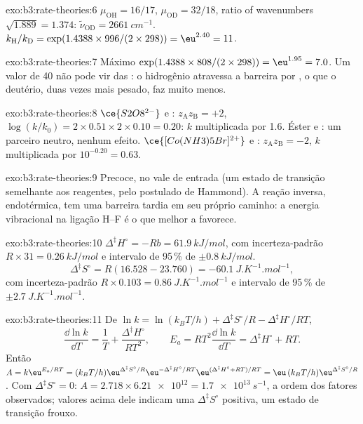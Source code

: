 \begin{solution}{exo:b3:rate-theories:6}
$\mu_{\mathrm{OH}} = 16/17$, $\mu_{\mathrm{OD}} = 32/18$, ratio of wavenumbers $\sqrt{1.889} = 1.374$:
$\tilde\nu_{\mathrm{OD}} = \qty{2661}{cm^{-1}}$. $k_{\mathrm H}/k_{\mathrm D} = \exp(1.4388 \times 996/(2 \times 298)) = \eu^{2.40} = 11$.
\end{solution}

\begin{solution}{exo:b3:rate-theories:7}
Máximo $\exp(1.4388 \times 808/(2 \times 298)) = \eu^{1.95} = 7.0$. Um valor de 40 não pode vir das
: o hidrogênio atravessa a barreira por , o que o
deutério, duas vezes mais pesado, faz muito menos.
\end{solution}

\begin{solution}{exo:b3:rate-theories:8}
$\ce{S2O8^{2-}}$ e : $z_{\mathrm A}z_{\mathrm B} = +2$, $\log(k/k_0) = 2 \times 0.51 \times 2 \times 0.10 = 0.20$: $k$
multiplicada por 1.6. Éster e : um parceiro neutro, nenhum efeito.
$\ce{[Co(NH3)5Br]^{2+}}$ e : $z_{\mathrm A}z_{\mathrm B} = -2$, $k$ multiplicada por $10^{-0.20} = 0.63$.
\end{solution}

\begin{solution}{exo:b3:rate-theories:9}
Precoce, no vale de entrada (um estado de transição semelhante aos reagentes, pelo
postulado de Hammond). A reação inversa, endotérmica, tem uma barreira tardia em
seu próprio caminho: a energia vibracional na ligação H--F é o que melhor a favorece.
\end{solution}

\begin{solution}{exo:b3:rate-theories:10}
$\Delta^{\ddagger}H^\circ = -Rb = \qty{61.9}{kJ/mol}$, com incerteza-padrão $R \times 31 = \qty{0.26}{kJ/mol}$ e
intervalo de 95\,\% de $\pm\qty{0.8}{kJ/mol}$.
\[
  \Delta^{\ddagger}S^\circ = R(16.528 - 23.760) = \qty{-60.1}{J.K^{-1}.mol^{-1}},
\]
com incerteza-padrão $R \times 0.103 = \qty{0.86}{J.K^{-1}.mol^{-1}}$ e intervalo de 95\,\% de $\pm\qty{2.7}{J.K^{-1}.mol^{-1}}$.
\end{solution}

\begin{solution}{exo:b3:rate-theories:11}
De $\ln k = \ln(k_BT/h) + \Delta^{\ddagger}S^\circ/R - \Delta^{\ddagger}H^\circ/RT$,
\[
  \frac{\dd\ln k}{\dd T} = \frac1T + \frac{\Delta^{\ddagger}H^\circ}{RT^2}, \qquad
  E_a = RT^2\frac{\dd\ln k}{\dd T} = \Delta^{\ddagger}H^\circ + RT .
\] Então $A = k\eu^{E_a/RT} = (k_BT/h)\eu^{\Delta^{\ddagger}S^\circ/R}\eu^{-\Delta^{\ddagger}H^\circ/RT}\eu^{(\Delta^{\ddagger}H^\circ + RT)/RT} =
\eu\,(k_BT/h)\eu^{\Delta^{\ddagger}S^\circ/R}$. Com $\Delta^{\ddagger}S^\circ = 0$: $A = 2.718 \times \num{6.21e12} = \qty{1.7e13}{s^{-1}}$, a
ordem dos fatores observados; valores acima dele indicam uma $\Delta^{\ddagger}S^\circ$ positiva, um
estado de transição frouxo.
\end{solution}

